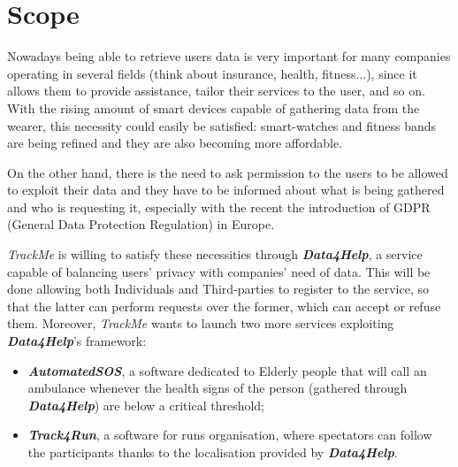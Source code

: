 \section{Scope}
    Nowadays being able to retrieve users data is very important for many companies operating in several fields (think about insurance, health, fitness...), since it allows them to provide assistance, tailor their services to the user, and so on. With the rising amount of smart devices capable of gathering data from the wearer, this necessity could easily be satisfied: smart-watches and fitness bands are being refined and they are also becoming more affordable.
    
    On the other hand, there is the need to ask permission to the users to be allowed to exploit their data and they have to be informed about what is being gathered and who is requesting it, especially with the recent the introduction of GDPR (General Data Protection Regulation) in Europe.
    
    \emph{TrackMe} is willing to satisfy these necessities through \textbf{\emph{Data4Help}}, a service capable of balancing users' privacy with companies' need of data. This will be done allowing both Individuals and Third-parties to register to the service, so that the latter can perform requests over the former, which can accept or refuse them.
    Moreover, \emph{TrackMe} wants to launch two more services exploiting \textbf{\emph{Data4Help}}'s framework:
    \begin{itemize}
        \item \textbf{\emph{AutomatedSOS}}, a software dedicated to Elderly people that will call an ambulance whenever the health signs of the person (gathered through \textbf{\emph{Data4Help}}) are below a critical threshold;
        \item \textbf{\emph{Track4Run}}, a software for runs organisation, where spectators can follow the participants thanks to the localisation provided by \textbf{\emph{Data4Help}}.
    \end{itemize}